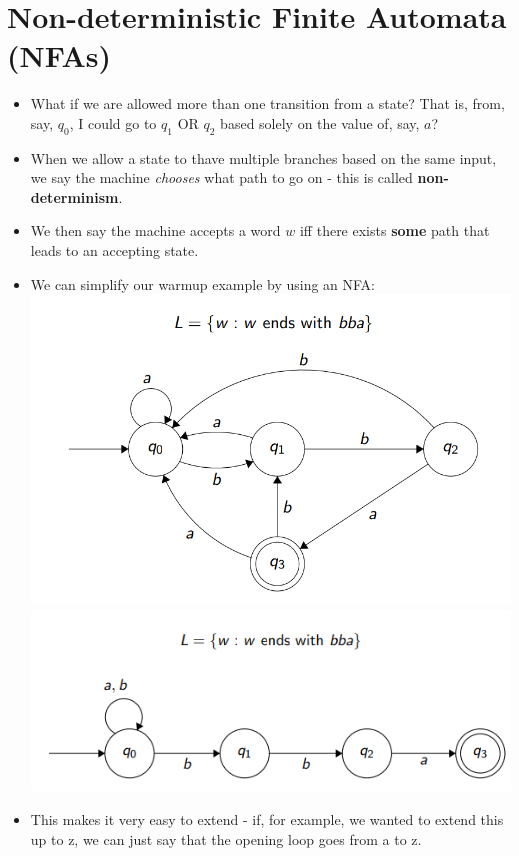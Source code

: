 \documentclass[12pt]{article}
\begin{document}
\section{Non-deterministic Finite Automata (NFAs)}
\begin{itemize}
    \item What if we are allowed more than one transition from a state?  That is, from, say, $q_0$, I could go to $q_1$ OR $q_2$ based solely on the value of, say, $a$?
    \item When we allow a state to thave multiple branches based on the same input, we say the machine \emph{chooses} what path to go on - this is called \textbf{non-determinism}.
    \item We then say the machine accepts a word $w$ iff there exists \textbf{some} path that leads to an accepting state.
        \newpage
    \item We can simplify our warmup example by using an NFA: \\
        \includegraphics[scale=0.5]{warmup.png}\\
        \includegraphics[scale=0.5]{nfawarmup.png}\\
    \item This makes it very easy to extend - if, for example, we wanted to extend this up to z, we can just say that the opening loop goes from a to z.

\end{itemize}
\end{document}
